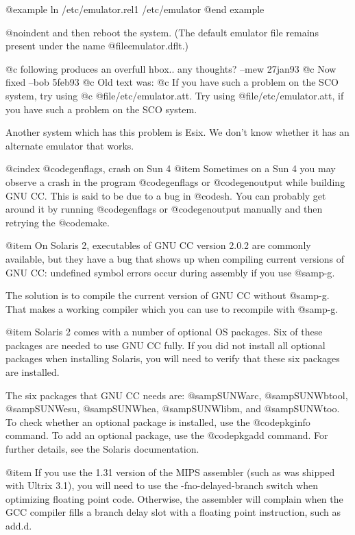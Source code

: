 @example
ln /etc/emulator.rel1 /etc/emulator
@end example

@noindent
and then reboot the system.  (The default emulator file remains present
under the name @file{emulator.dflt}.)

@c following produces an overfull hbox.. any thoughts?  --mew 27jan93
@c Now fixed --bob 5feb93
@c Old text was:
@c If you have such a problem on the SCO system, try using
@c @file{/etc/emulator.att}.
Try using @file{/etc/emulator.att}, if you have such a problem on the
SCO system.

Another system which has this problem is Esix.  We don't know whether it
has an alternate emulator that works.

@cindex @code{genflags}, crash on Sun 4
@item
Sometimes on a Sun 4 you may observe a crash in the program
@code{genflags} or @code{genoutput} while building GNU CC.  This is said to
be due to a bug in @code{sh}.  You can probably get around it by running
@code{genflags} or @code{genoutput} manually and then retrying the
@code{make}.

@item
On Solaris 2, executables of GNU CC version 2.0.2 are commonly
available, but they have a bug that shows up when compiling current
versions of GNU CC: undefined symbol errors occur during assembly if you
use @samp{-g}.

The solution is to compile the current version of GNU CC without
@samp{-g}.  That makes a working compiler which you can use to recompile
with @samp{-g}.

@item
Solaris 2 comes with a number of optional OS packages.  Six of these
packages are needed to use GNU CC fully.  If you did not install all
optional packages when installing Solaris, you will need to verify that
these six packages are installed.

The six packages that GNU CC needs are: @samp{SUNWarc},
@samp{SUNWbtool}, @samp{SUNWesu}, @samp{SUNWhea}, @samp{SUNWlibm}, and
@samp{SUNWtoo}.  To check whether an optional package is installed, use
the @code{pkginfo} command.  To add an optional package, use the
@code{pkgadd} command.  For further details, see the Solaris
documentation.

@item
If you use the 1.31 version of the MIPS assembler (such as was shipped
with Ultrix 3.1), you will need to use the -fno-delayed-branch switch
when optimizing floating point code.  Otherwise, the assembler will
complain when the GCC compiler fills a branch delay slot with a
floating point instruction, such as add.d.

